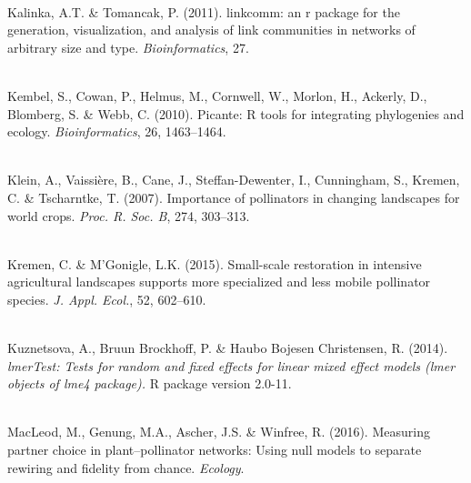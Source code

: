\documentclass[12pt]{article}
\begin{document}
\begin{thebibliography}{67}
\hspace{0em}\\Kalinka, A.T. \& Tomancak, P. (2011).
\newblock linkcomm: an r package for the generation, visualization, and
  analysis of link communities in networks of arbitrary size and type.
\newblock \emph{Bioinformatics}, 27.

\hspace{0em}\\Kembel, S., Cowan, P., Helmus, M., Cornwell, W., Morlon, H.,
  Ackerly, D., Blomberg, S. \& Webb, C. (2010).
\newblock Picante: {R} tools for integrating phylogenies and ecology.
\newblock \emph{Bioinformatics}, 26, 1463--1464.

\hspace{0em}\\Klein, A., Vaissi\`{e}re, B., Cane, J., Steffan-Dewenter, I.,
  Cunningham, S., Kremen, C. \& Tscharntke, T. (2007).
\newblock Importance of pollinators in changing landscapes for world crops.
\newblock \emph{Proc. R. Soc. B}, 274, 303--313.

\hspace{0em}\\Kremen, C. \& M'Gonigle, L.K. (2015).
\newblock Small-scale restoration in intensive agricultural landscapes supports
  more specialized and less mobile pollinator species.
\newblock \emph{J. Appl. Ecol.}, 52, 602--610.

\hspace{0em}\\Kuznetsova, A., {Bruun Brockhoff}, P. \& {Haubo Bojesen
  Christensen}, R. (2014).
\newblock \emph{{lmerTest}: Tests for random and fixed effects for linear mixed
  effect models (lmer objects of lme4 package).}
\newblock R package version 2.0-11.

\hspace{0em}\\MacLeod, M., Genung, M.A., Ascher, J.S. \& Winfree, R. (2016).
\newblock Measuring partner choice in plant--pollinator networks: Using null
  models to separate rewiring and fidelity from chance.
\newblock \emph{Ecology}.


\end{thebibliography}
\end{document}
